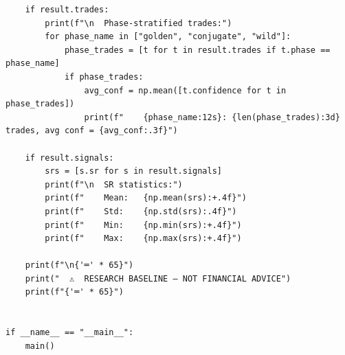 \begin{verbatim}
    if result.trades:
        print(f"\n  Phase-stratified trades:")
        for phase_name in ["golden", "conjugate", "wild"]:
            phase_trades = [t for t in result.trades if t.phase == phase_name]
            if phase_trades:
                avg_conf = np.mean([t.confidence for t in phase_trades])
                print(f"    {phase_name:12s}: {len(phase_trades):3d} trades, avg conf = {avg_conf:.3f}")

    if result.signals:
        srs = [s.sr for s in result.signals]
        print(f"\n  SR statistics:")
        print(f"    Mean:   {np.mean(srs):+.4f}")
        print(f"    Std:    {np.std(srs):.4f}")
        print(f"    Min:    {np.min(srs):+.4f}")
        print(f"    Max:    {np.max(srs):+.4f}")

    print(f"\n{'═' * 65}")
    print("  ⚠  RESEARCH BASELINE — NOT FINANCIAL ADVICE")
    print(f"{'═' * 65}")


if __name__ == "__main__":
    main()
\end{verbatim}


